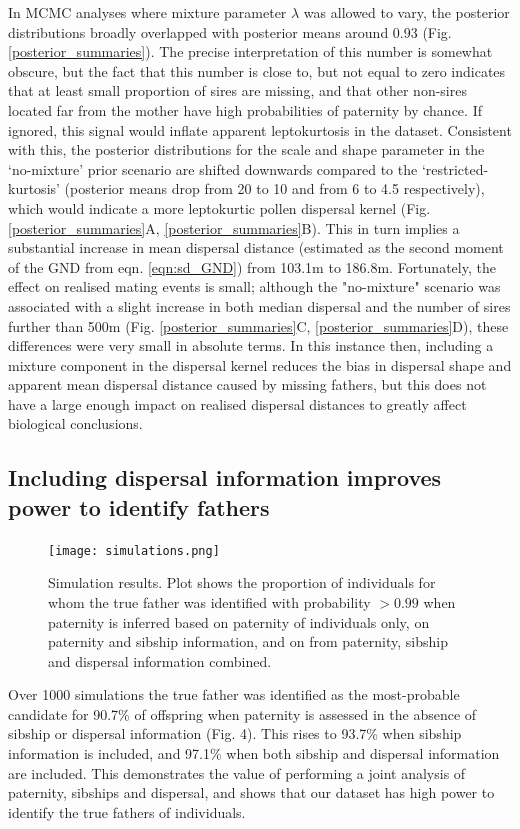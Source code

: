 \documentclass[10pt, a4paper, twocolumn]{article} %
\begin{document}
In MCMC analyses where mixture parameter $\lambda$ was allowed to vary, the posterior distributions broadly overlapped with posterior means around 0.93 (Fig. \ref{posterior_summaries}).
The precise interpretation of this number is somewhat obscure, but the fact that this number is close to, but not equal to zero indicates that at least small proportion of sires are missing, and that other non-sires located far from the mother have high probabilities of paternity by chance.
If ignored, this signal would inflate apparent leptokurtosis in the dataset.
Consistent with this, the posterior distributions for the scale and shape parameter in the ‘no-mixture’ prior scenario are shifted downwards compared to the ‘restricted-kurtosis’ (posterior means drop from 20 to 10 and from 6 to 4.5 respectively), which would indicate a more leptokurtic pollen dispersal kernel (Fig. \ref{posterior_summaries}A, \ref{posterior_summaries}B).
This in turn implies a substantial increase in mean dispersal distance (estimated as the second moment of the GND from eqn. \ref{eqn:sd_GND}) from 103.1m to 186.8m.
Fortunately, the effect on realised mating events is small; although the "no-mixture" scenario was associated with a slight increase in both median dispersal and the number of sires further than 500m (Fig. \ref{posterior_summaries}C, \ref{posterior_summaries}D), these differences were very small in absolute terms.
In this instance then, including a mixture component in the dispersal kernel reduces the bias in dispersal shape and apparent mean dispersal distance caused by missing fathers, but this does not have a large enough impact on realised dispersal distances to greatly affect biological conclusions.

\subsection{Including dispersal information improves power to identify fathers}

\begin{figure}
    \texttt{[image: simulations.png]}
    \caption{Simulation results. Plot shows the proportion of individuals for whom the true father was identified with probability $>0.99$ when paternity is inferred based on paternity of individuals only, on paternity and sibship information, and on from paternity, sibship and dispersal information combined.}
    \label{fig:simulations}
\end{figure}

Over 1000 simulations the true father was identified as the most-probable candidate for 90.7\% of offspring when paternity is assessed in the absence of sibship or dispersal information (Fig. 4). This rises to 93.7\% when sibship information is included, and 97.1\% when both sibship and dispersal information are included. This demonstrates the value of performing a joint analysis of paternity, sibships and dispersal, and shows that our dataset has high power to identify the true fathers of individuals.
\end{document}
